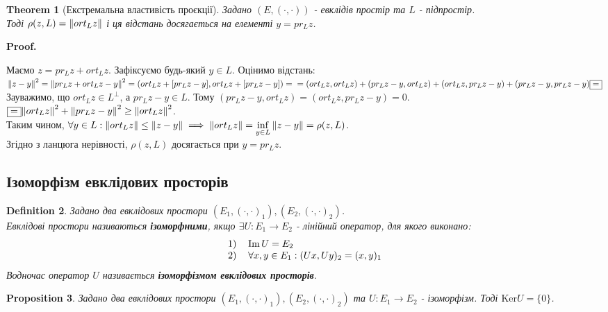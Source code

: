 \documentclass[a4paper, 10pt]{article}
\makeatletter
\def\huge{\displaystyle}
\def\qed{$\blacksquare$}
\def\ker#1{\textrm{Ker} {#1}}
\theoremstyle{theoremdd}
\newtheorem{theorem}{Theorem}[subsection]
\theoremstyle{theoremdd}
\newtheorem{definition}[theorem]{Definition}
\theoremstyle{theoremdd}
\theoremstyle{theoremdd}
\theoremstyle{theoremdd}
\newtheorem{proposition}[theorem]{Proposition}
\theoremstyle{theoremdd}
\theoremstyle{theoremdd}
\theoremstyle{theoremdd}
\renewenvironment{proof}[1][Proof.\\]{\par
\pushQED{\hfill \qed}%
\normalfont \topsep6\p@\@plus6\p@\relax
\trivlist
\item\relax
{\bfseries
#1\@addpunct{.}}\hspace\labelsep\ignorespaces
}{%
\popQED\endtrivlist\@endpefalse
}
\makeatother
\begin{document}
\begin{theorem}[Екстремальна властивість проєкції]
Задано $(E,(\cdot,\cdot))$ - евклідів простір та $L$ - підпростір.\\
Тоді $\rho(z,L) = \norm{ort_L z}$ і ця відстань досягається на елементі $y = pr_L z$.
\end{theorem}

\begin{proof}
Маємо $z = pr_L z + ort_L z$. Зафіксуємо будь-який $y \in L$. Оцінимо відстань:\\
$\norm{z-y}^2 = \norm{pr_L z + ort_L z - y}^2 = (ort_L z + [pr_L z - y], ort_L z + [pr_L z - y]) = \\ = (ort_L z, ort_L z) + (pr_L z - y,ort_L z) + (ort_L z,pr_L z - y) + (pr_L z-y, pr_L z-y) \boxed{=}$\\
Зауважимо, що $ort_L z \in L^\perp$, а $pr_L z - y \in L$. Тому $(pr_L z-y,ort_L z) = (ort_L z, pr_L z -y) = 0$.\\
$\boxed{=} \norm{ort_L z}^2 + \norm{pr_L z - y}^2 \geq \norm{ort_L z}^2$.\\
Таким чином, $\forall y \in L: \norm{ort_L z} \leq \norm{z-y} \implies \norm{ort_L z} = \huge\inf_{y \in L} \norm{z-y} = \rho(z,L)$.\\
Згідно з ланцюга нерівності, $\rho (z,L)$ досягається при $y = pr_L z$.
\end{proof}

\subsection{Ізоморфізм евклідових просторів}
\begin{definition}
Задано два евклідових простори $(E_1,(\cdot,\cdot)_1), (E_2,(\cdot,\cdot)_2)$.\\
Евклідові простори називаються \textbf{ізоморфними}, якщо $\exists U: E_1 \to E_2$ - лінійний оператор, для якого виконано:
\begin{align*}
\begin{tabular}{cl}
1) & $\Im U = E_2$ \\
2) & $\forall x,y \in E_1: (Ux,Uy)_2 = (x,y)_1$
\end{tabular}
\end{align*}
Водночас оператор $U$ називається \textbf{ізоморфізмом евклідових просторів}.
\end{definition}

\begin{proposition}
Задано два евклідових простори $(E_1,(\cdot,\cdot)_1), (E_2,(\cdot,\cdot)_2)$ та $U: E_1 \to E_2$ - ізоморфізм. Тоді $\ker U = \{0\}$.
\end{proposition}
\end{document}

